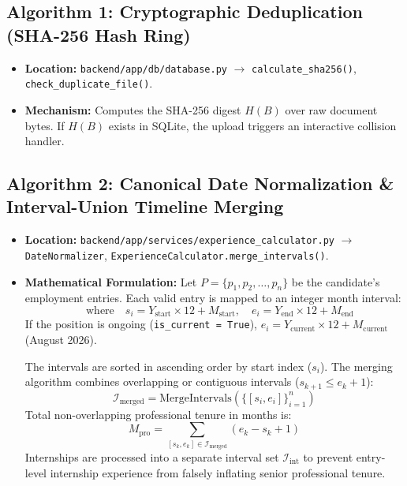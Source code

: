 \documentclass[11pt,a4paper]{report}
\begin{document}
\subsection{Algorithm 1: Cryptographic Deduplication (SHA-256 Hash Ring)}
\begin{itemize}[leftmargin=1.5em]
    \item \textbf{Location:} \texttt{backend/app/db/database.py} $\to$ \texttt{calculate\_sha256()}, \texttt{check\_duplicate\_file()}.
    \item \textbf{Mechanism:} Computes the SHA-256 digest $H(B)$ over raw document bytes. If $H(B)$ exists in SQLite, the upload triggers an interactive collision handler.
\end{itemize}

\subsection{Algorithm 2: Canonical Date Normalization \& Interval-Union Timeline Merging}
\begin{itemize}[leftmargin=1.5em]
    \item \textbf{Location:} \texttt{backend/app/services/experience\_calculator.py} $\to$ \texttt{DateNormalizer}, \texttt{ExperienceCalculator.merge\_intervals()}.
    \item \textbf{Mathematical Formulation:}
    Let $P = \{p_1, p_2, \dots, p_n\}$ be the candidate's employment entries. Each valid entry is mapped to an integer month interval:
    \begin{equation}
        [s_i, e_i] \quad \text{where} \quad s_i = Y_{\text{start}} \times 12 + M_{\text{start}}, \quad e_i = Y_{\text{end}} \times 12 + M_{\text{end}}
    \end{equation}
    If the position is ongoing (\texttt{is\_current = True}), $e_i = Y_{\text{current}} \times 12 + M_{\text{current}}$ (August 2026).
    
    The intervals are sorted in ascending order by start index ($s_i$). The merging algorithm combines overlapping or contiguous intervals ($s_{k+1} \le e_k + 1$):
    \begin{equation}
        \mathcal{I}_{\text{merged}} = \text{MergeIntervals}\left( \{ [s_i, e_i] \}_{i=1}^n \right)
    \end{equation}
    Total non-overlapping professional tenure in months is:
    \begin{equation}
        M_{\text{pro}} = \sum_{[s_k, e_k] \in \mathcal{I}_{\text{merged}}} (e_k - s_k + 1)
    \end{equation}
    Internships are processed into a separate interval set $\mathcal{I}_{\text{int}}$ to prevent entry-level internship experience from falsely inflating senior professional tenure.
\end{itemize}
\end{document}
